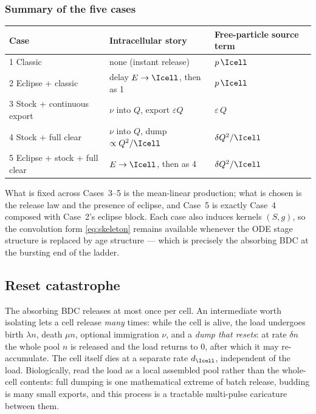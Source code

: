 \subsubsection{Summary of the five cases}

\begin{center}
\renewcommand{\arraystretch}{1.25}
\small
\begin{tabular}{@{}p{}p{}p{}@{}}
\toprule
Case & Intracellular story & Free-particle source term \\
\midrule
1 Classic & none (instant release) & $p\,\Icell$ \\
2 Eclipse + classic & delay $E\to\Icell$, then as 1 & $p\,\Icell$ \\
3 Stock + continuous export & $\nu$ into $Q$, export $\varepsilon Q$ & $\varepsilon\,Q$ \\
4 Stock + full clear & $\nu$ into $Q$, dump $\propto Q^2/\Icell$ & $\delta Q^2/\Icell$ \\
5 Eclipse + stock + full clear & $E\to\Icell$, then as 4 & $\delta Q^2/\Icell$ \\
\bottomrule
\end{tabular}
\end{center}
What is fixed across Cases~3--5 is the mean-linear production; what is
chosen is the release law and the presence of eclipse, and Case~5 is
exactly Case~4 composed with Case~2's eclipse block. Each case also induces
kernels $(S,g)$, so the convolution form \eqref{eq:skeleton} remains
available whenever the ODE stage structure is replaced by age structure ---
which is precisely the absorbing BDC at the bursting end of the ladder.

\subsection{Reset catastrophe}
\label{sec:reset}

The absorbing BDC releases at most once per cell. An intermediate worth
isolating lets a cell release \emph{many} times: while the cell is alive,
the load undergoes birth $\lambda n$, death $\mu n$, optional immigration
$\nu$, and a \emph{dump that resets}: at rate $\delta n$ the whole pool $n$
is released and the load returns to $0$, after which it may re-accumulate.
The cell itself dies at a separate rate $d_{\Icell}$, independent of the
load. Biologically, read the load as a local assembled pool rather than the
whole-cell contents: full dumping is one mathematical extreme of batch
release, budding is many small exports, and this process is a tractable
multi-pulse caricature between them.

